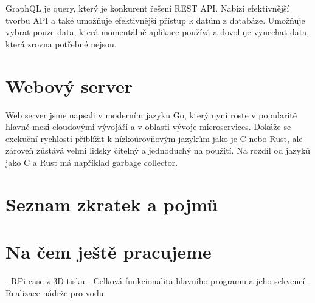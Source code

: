 \documentclass[11pt,a4paper]{article}
\begin{document}
GraphQL je query, který je konkurent řešení REST API. Nabízí efektivnější tvorbu API a také umožňuje efektivnější přístup k datům z databáze. Umožňuje vybrat pouze data, která momentálně aplikace používá a dovoluje vynechat data, která zrovna potřebné nejsou.

\section*{Webový server}

Web server jsme napsali v moderním jazyku Go, který nyní roste v popularitě hlavně mezi cloudovými vývojáři a v oblasti vývoje microservices. Dokáže se exekuční rychlostí přiblížit k nízkoúrovňovým jazykům jako je C nebo Rust, ale zároveň zůstává velmi lidsky čitelný a jednoduchý na použití. Na rozdíl od jazyků jako C a Rust má například garbage collector.

\section*{Seznam zkratek a pojmů}

\section*{Na čem ještě pracujeme}

- RPi case z 3D tisku
- Celková funkcionalita hlavního programu a jeho sekvencí
- Realizace nádrže pro vodu


\clearpage

\begin{acronym}
\end{acronym}
\end{document}
